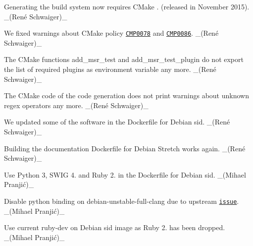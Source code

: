 \begin{DoxyItemize}
\item Generating the build system now requires C\+Make {.} (released in November 2015). \+\_\+(René Schwaiger)\+\_\+
\item We fixed warnings about C\+Make policy \href{https://cmake.org/cmake/help/latest/policy/CMP0078.html}{\tt C\+M\+P0078} and \href{https://cmake.org/cmake/help/latest/policy/CMP0086.html}{\tt C\+M\+P0086}. \+\_\+(René Schwaiger)\+\_\+
\item The C\+Make functions {\ttfamily add\+\_\+msr\+\_\+test} and {\ttfamily add\+\_\+msr\+\_\+test\+\_\+plugin} do not export the list of required plugins as environment variable any more. \+\_\+(René Schwaiger)\+\_\+
\item The C\+Make code of the code generation does not print warnings about unknown regex operators any more. \+\_\+(René Schwaiger)\+\_\+
\end{DoxyItemize}


\begin{DoxyItemize}
\item We updated some of the software in the Dockerfile for Debian sid. \+\_\+(René Schwaiger)\+\_\+
\item Building the documentation Dockerfile for Debian Stretch works again. \+\_\+(René Schwaiger)\+\_\+
\item Use Python 3, S\+W\+IG 4. and Ruby 2. in the Dockerfile for Debian sid. \+\_\+(Mihael Pranjić)\+\_\+
\item Disable python binding on {\ttfamily debian-\/unstable-\/full-\/clang} due to upstream \href{https://github.com/ElektraInitiative/libelektra/issues/3379}{\tt issue}. \+\_\+(Mihael Pranjić)\+\_\+
\item Use current ruby-\/dev on Debian sid image as Ruby 2. has been dropped. \+\_\+(Mihael Pranjić)\+\_\+
\end{DoxyItemize}


